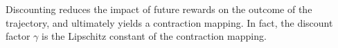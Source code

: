 Discounting reduces the impact of future rewards on the outcome of the trajectory, and ultimately yields a contraction mapping. In fact, the discount factor $\gamma$ is the Lipschitz constant of the contraction mapping.





